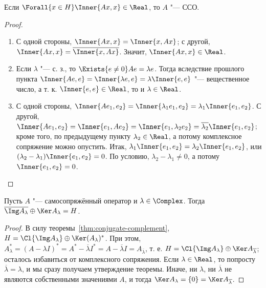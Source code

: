\documentclass[main]{subfiles}
\begin{document}
\begin{exercise}
  Если \( \Forall{x \in H} \Inner{Ax, x} \in \Real \),
  то \( A \) "--- ССО.
\end{exercise}

\begin{proof}~\begin{enumerate}
  \item С одной стороны, \( \Inner{Ax, x} = \Inner{x, Ax} \);
    с другой, \( \Inner{Ax, x} = \overline{\Inner{x, Ax}} \).
    Значит, \( \Inner{Ax, x} \in \Real \).
  \item Если \( \lambda \) "--- с. з., то
    \( \Exists{e \ne 0} Ae = \lambda e \).
    Тогда вследствие прошлого пункта
    \( \Inner{Ae, e} = \Inner{\lambda e, e} =
    \lambda \Inner{e, e} \) "---
    вещественное число, а т. к. \( \Inner{e, e} \in \Real \),
    то и \( \lambda \in \Real \).
  \item С одной стороны,
    \( \Inner{A e_1, e_2} = \Inner{\lambda_1 e_1, e_2} =
    \lambda_1 \Inner{e_1, e_2} \).
    С другой,
    \( \Inner{A e_1, e_2} = \Inner{e_1, A e_2} =
    \Inner{e_1, \lambda_2 e_2} =
    \overline{\lambda_2} \Inner{e_1, e_2} \);
    кроме того, по предыдущему пункту \( \lambda_2 \in \Real \),
    а потому комплексное сопряжение можно опустить.
    Итак, \( \lambda_1 \Inner{e_1, e_2} =
    \lambda_2 \Inner{e_1, e_2} \),
    или \( (\lambda_2 - \lambda_1) \Inner{e_1, e_2} = 0 \).
    По условию, \( \lambda_2 - \lambda_1 \ne 0 \),
    а потому \( \Inner{e_1, e_2} = 0 \).
\end{enumerate}\end{proof}

\begin{theorem}\label{thm:selfconjugate-complement}%
  Пусть \( A \) "--- самосопряжённый оператор и
  \( \lambda \in \Complex \).
  Тогда
  \( \overline{\Img A_\lambda} \oplus
  \Ker A_{\lambda} = H \).
\end{theorem}
\begin{proof}
  В силу теоремы~\ref{thm:conjugate-complement},
  \( H = \Cl{\Img A_\lambda} \oplus \Ker (A_\lambda)^* \).
  При этом,
  \( A_\lambda^* = (A - \lambda I)^* =
  A^* - \overline{\lambda} I^* =
  A - \overline{\lambda} I =
  A_{\overline{\lambda}} \),
  т. е. \( H = \Cl{\Img A_\lambda} \oplus \Ker A_{\overline{\lambda}} \);
  осталось избавиться от комплексного сопряжения.
  Если \( \lambda \in \Real \), то попросту
  \( \overline{\lambda} = \lambda \),
  и мы сразу получаем утверждение теоремы.
  Иначе, ни \( \lambda \),
  ни \( \overline{\lambda} \) не являются собственными
  значениями \( A \), и тогда
  \( \Ker A_\lambda = \{ 0 \} = \Ker A_{\overline\lambda} \).
\end{proof}
\end{document}
